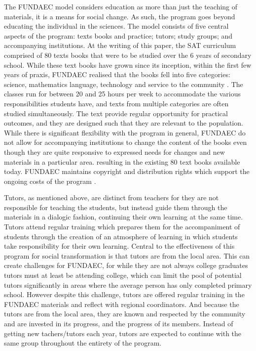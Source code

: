 The FUNDAEC model considers education as more than just the teaching of materials, it is a means for social change. As such, the program goes beyond educating the individual in the sciences. The model consists of five central aspects of the program: texts books and practice; tutors; study groups; and accompanying institutions. At the writing of this paper, the SAT curriculum comprised of 80 texts books that were to be studied over the 6 years of secondary school. While these text books have grown since its inception, within the first few years of praxis, FUNDAEC realised that the books fell into five categories: science, mathematics language, technology and service to the community \citep{Arbab1988}. The classes run for between 20 and 25 hours per week to accommodate the various responsibilities students have, and texts from multiple categories are often studied simultaneously. The text provide regular opportunity for practical outcomes, and they are designed such that they are relevant to the population. While there is significant flexibility with the program in general, FUNDAEC do not allow for accompanying institutions to change the content of the books even though they are quite responsive to expressed needs for changes and new materials in a particular area. resulting in the existing 80 text books available today. FUNDAEC maintains copyright and distribution rights which support the ongoing costs of the program \citep{Kwauk2016}.

Tutors, as mentioned above, are distinct from teachers for they are not responsible for teaching the students, but instead guide them through the materials in a dialogic fashion, continuing their own learning at the same time. Tutors attend regular training which prepares them for the accompaniment of students through the creation of an atmosphere of learning in which students take responsibility for their own learning. Central to the effectiveness of this program for social transformation is that tutors are from the local area. This can create challenges for FUNDAEC, for while they are not always college graduates tutors must at least be attending college, which can limit the pool of potential tutors significantly in areas where the average person has only completed primary school. However despite this challenge, tutors are offered regular training in the FUNDAEC materials and reflect with regional coordinators. And because the tutors are from the local area, they are known and respected by the community and are invested in its progress, and the progress of its members. Instead of getting new tachers/tutors each year, tutors are expected to continue with the same group throughout the entirety of the program.


